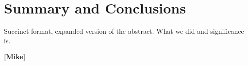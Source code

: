 
\section{Summary and Conclusions}
\label{Conclusions}

Succinct format, expanded version of the abstract.  What we did and significance is.

{\bf [Mike]}

